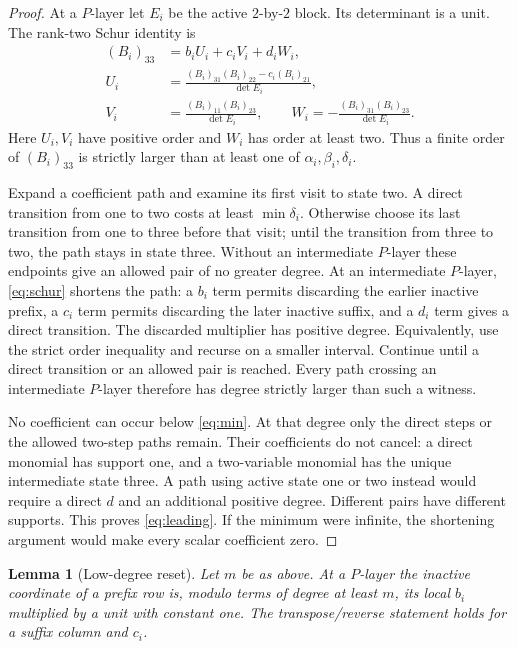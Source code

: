 \documentclass[11pt]{article}
\newtheorem{lemma}[theorem]{Lemma}
\begin{document}
\begin{proof}
At a \(P\)-layer let \(E_i\) be the active \(2\)-by-\(2\) block.
Its determinant is a unit. The rank-two Schur identity is
\begin{align}
 (B_i)_{33}&=b_iU_i+c_iV_i+d_iW_i,\label{eq:schur}\\
 U_i&=\frac{(B_i)_{31}(B_i)_{22}-c_i(B_i)_{21}}{\det E_i},\nonumber\\
 V_i&=\frac{(B_i)_{11}(B_i)_{23}}{\det E_i},\qquad
 W_i=-\frac{(B_i)_{31}(B_i)_{23}}{\det E_i}.\nonumber
\end{align}
Here \(U_i,V_i\) have positive order and \(W_i\) has order at least
two. Thus a finite order of \((B_i)_{33}\) is strictly larger than
at least one of \(\alpha_i,\beta_i,\delta_i\).

Expand a coefficient path and examine its first visit to state two.
A direct transition from one to two costs at least \(\min\delta_i\).
Otherwise choose its last transition from one to three before that
visit; until the transition from three to two, the path stays in
state three. Without an intermediate \(P\)-layer these endpoints
give an allowed pair of no greater degree. At an intermediate
\(P\)-layer, \eqref{eq:schur} shortens the path: a \(b_i\) term permits
discarding the earlier inactive prefix, a \(c_i\) term permits
discarding the later inactive suffix, and a \(d_i\) term gives a direct
transition. The discarded multiplier has positive degree. Equivalently,
use the strict order inequality and recurse on a smaller interval.
Continue until a direct transition or an allowed pair is reached.
Every path crossing an intermediate \(P\)-layer therefore has degree
strictly larger than such a witness.

No coefficient can occur below \eqref{eq:min}. At that degree only
the direct steps or the allowed two-step paths remain. Their
coefficients do not cancel: a direct monomial has support one, and a
two-variable monomial has the unique intermediate state three. A path
using active state one or two instead would require a direct \(d\)
and an additional positive degree. Different pairs have different
supports. This proves \eqref{eq:leading}. If the minimum were infinite,
the shortening argument would make every scalar coefficient zero.
\end{proof}

\begin{lemma}[Low-degree reset]\label{lem:reset}
Let \(m\) be as above. At a \(P\)-layer the inactive coordinate of a
prefix row is, modulo terms of degree at least \(m\), its local
\(b_i\) multiplied by a unit with constant one. The transpose/reverse
statement holds for a suffix column and \(c_i\).
\end{lemma}
\end{document}
